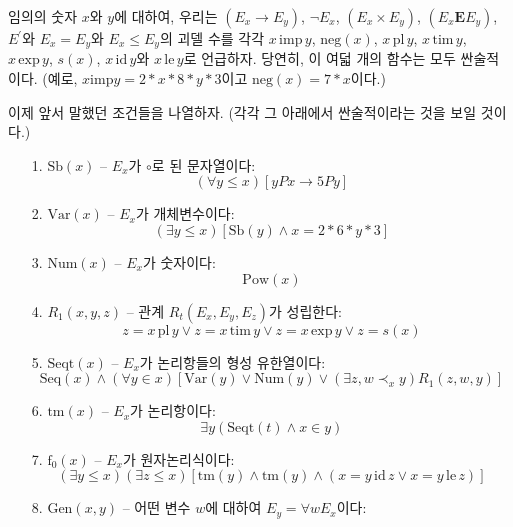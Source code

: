 \documentclass[12pt]{paper}
\begin{document}
임의의 숫자 $x$와 $y$에 대하여, 우리는 $\left( E_{x} \rightarrow E_{y} \right)$, $\lnot E_{x}$, $\left( E_{x} \times E_{y} \right)$, $\left( E_{x} \mathrm{\mathbf{E}} E_{y} \right)$, $E^{\prime}$와 $E_{x} = E_{y}$와 $E_{x} \le E_{y}$의 괴델 수를
각각 $x \, \mathrm{imp} \, y$, $\mathrm{neg} \left( x \right)$, $x \, \mathrm{pl} \, y$, $x \, \mathrm{tim} \, y$, $x \, \mathrm{exp} \, y$, $s \left( x \right)$, $x \, \mathrm{id} \, y$와 $x \, \mathrm{le} \, y$로 언급하자.
당연히, 이 여덟 개의 함수는 모두 싼술적이다. (예로, $x \mathrm{imp} y = 2 * x * 8 * y * 3$이고 $\mathrm{neg} \left( x \right) = 7 * x$이다.)

이제 앞서 말했던 조건들을 나열하자. (각각 그 아래에서 싼술적이라는 것을 보일 것이다.)
\begin{enumerate}
\item[{1.}] $\mathrm{Sb} \left( x \right)$ -- $E_x$가 $\circ$로 된 문자열이다:
$$ \left( \forall y \le x \right) \left[ y P x \rightarrow 5 P y \right] $$
\item[{2.}] $\mathrm{Var} \left( x \right)$ -- $E_x$가 개체변수이다:
$$ \left( \exists y \le x \right) \left[ \mathrm{Sb} \left( y \right) \land x = 2 * 6 * y * 3 \right] $$
\item[{3.}] $\mathrm{Num} \left( x \right)$ -- $E_x$가 숫자이다:
$$ \mathrm{Pow}\left( x \right) $$
\item[{4.}] $R_1 \left( x , y , z \right)$ -- 관계 $R_t \left( E_x , E_y , E_z \right)$가 성립한다:
$$ z = x \, \mathrm{pl} \, y \lor z = x \, \mathrm{tim} \, y \lor z = x \, \mathrm{exp} \, y \lor z = s \left( x \right) $$
\item[{5.}] $\mathrm{Seqt} \left( x \right)$ -- $E_{x}$가 논리항들의 형성 유한열이다:
$$ \mathrm{Seq} \left( x \right) \land \left( \forall y \in x \right) \left[ \mathrm{Var} \left( y \right) \lor \mathrm{Num} \left( y \right) \lor \left( \exists z , w \prec_x y \right) R_1 \left( z , w , y \right) \right] $$
\item[{6.}] $\mathrm{tm} \left( x \right)$ -- $E_{x}$가 논리항이다:
$$ \exists y \left( \mathrm{Seqt} \left( t \right) \land x \in y \right) $$
\item[{7.}] $\mathrm{f}_0 \left( x \right)$ -- $E_{x}$가 원자논리식이다:
$$ \left( \exists y \le x \right) \left( \exists z \le x \right) \left[ \mathrm{tm}\left( y \right) \land \mathrm{tm}\left( y \right) \land \left( x = y \, \mathrm{id} \, z \lor x = y \, \mathrm {le} \, z \right) \right] $$
\item[{8.}] $\mathrm{Gen} \left( x , y \right)$ -- 어떤 변수 $w$에 대하여 $E_y = \forall w E_x $이다:

\end{enumerate}
\end{document}
